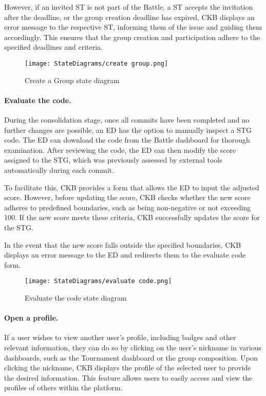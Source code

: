 However, if an invited ST is not part of the Battle, a ST accepts the invitation after the deadline, or the group creation deadline has expired, CKB displays an error message to the respective ST, informing them of the issue and guiding them accordingly. This ensures that the group creation and participation adhere to the specified deadlines and criteria.

\begin{figure}[H]
    \begin{center}
        \texttt{[image: StateDiagrams/create group.png]}
        \caption{Create a Group state diagram}
        \label{fig:create_group_sd}%
    \end{center}
\end{figure}

\paragraph{Evaluate the code.}
During the consolidation stage, once all commits have been completed and no further changes are possible, an ED has the option to manually inspect a STG code. The ED can download the code from the Battle dashboard for thorough examination. After reviewing the code, the ED can then modify the score assigned to the STG, which was previously assessed by external tools automatically during each commit.

To facilitate this, CKB provides a form that allows the ED to input the adjusted score. However, before updating the score, CKB checks whether the new score adheres to predefined boundaries, such as being non-negative or not exceeding 100. If the new score meets these criteria, CKB successfully updates the score for the STG.

In the event that the new score falls outside the specified boundaries, CKB displays an error message to the ED and redirects them to the evaluate code form.

\begin{figure}[H]
    \begin{center}
        \texttt{[image: StateDiagrams/evaluate code.png]}
        \caption{Evaluate the code state diagram}
        \label{fig:evaluate_code_sd}%
    \end{center}
\end{figure}

\paragraph{Open a profile.}
If a user wishes to view another user's profile, including badges and other relevant information, they can do so by clicking on the user's nickname in various dashboards, such as the Tournament dashboard or the group composition. Upon clicking the nickname, CKB displays the profile of the selected user to provide the desired information. This feature allows users to easily access and view the profiles of others within the platform.

